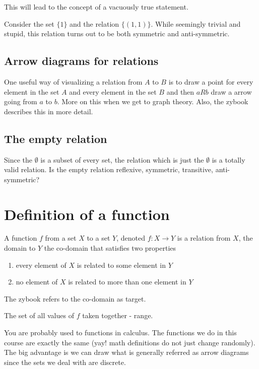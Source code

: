 \documentclass[12pt]{article}
\begin{document}
This will lead to the concept of a vacuously true statement. 

Consider the set $\{1\}$ and the relation $\{(1,1)\}$. While seemingly trivial and stupid, this relation turns out to be both symmetric and anti-symmetric.

\subsection*{Arrow diagrams for relations}

One useful way of visualizing a relation from $A$ to $B$ is to draw a point for every element in the set $A$ and every element in the set $B$ and then $aRb$ draw a arrow going from $a$ to $b$. More on this when we get to graph theory. Also, the zybook describes this in more detail.

\subsection*{The empty relation}

Since the $\emptyset$ is a subset of every set, the relation which is just the $\emptyset$ is a totally valid relation. Is the empty relation reflexive, symmetric, transitive, anti-symmetric? 


\section*{Definition of a function}

A function $f$ from a set $X$ to a set $Y$, denoted $f : X \rightarrow Y$ is a relation from $X$, the domain
to $Y$ the co-domain that satisfies two properties

\begin{enumerate}
\item every element of $X$ is related to some element in $Y$
\item no element of $X$ is related to more than one element in $Y$
\end{enumerate}

The zybook refers to the co-domain as target. 

The set of all values of  $f$ taken together - range. 

You are probably used to functions in calculus. The functions we do in this course are exactly the same (yay! math definitions do not just change randomly). The big advantage is we can draw what is generally referred as arrow diagrams since the sets we deal with are discrete.
\end{document}
